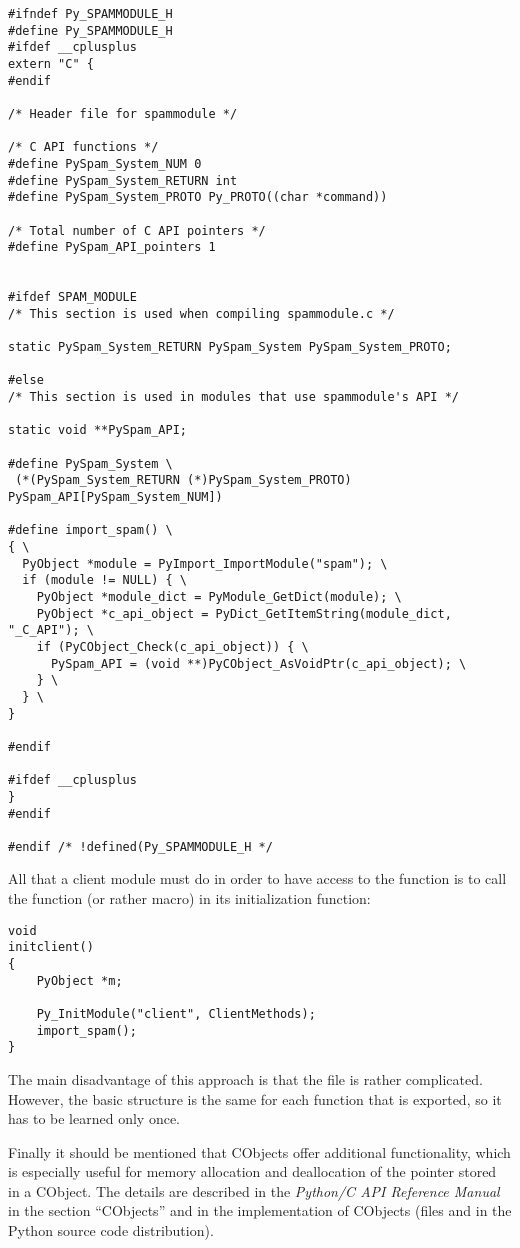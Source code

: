 \documentclass{manual}
\begin{document}
\begin{verbatim}
#ifndef Py_SPAMMODULE_H
#define Py_SPAMMODULE_H
#ifdef __cplusplus
extern "C" {
#endif

/* Header file for spammodule */

/* C API functions */
#define PySpam_System_NUM 0
#define PySpam_System_RETURN int
#define PySpam_System_PROTO Py_PROTO((char *command))

/* Total number of C API pointers */
#define PySpam_API_pointers 1


#ifdef SPAM_MODULE
/* This section is used when compiling spammodule.c */

static PySpam_System_RETURN PySpam_System PySpam_System_PROTO;

#else
/* This section is used in modules that use spammodule's API */

static void **PySpam_API;

#define PySpam_System \
 (*(PySpam_System_RETURN (*)PySpam_System_PROTO) PySpam_API[PySpam_System_NUM])

#define import_spam() \
{ \
  PyObject *module = PyImport_ImportModule("spam"); \
  if (module != NULL) { \
    PyObject *module_dict = PyModule_GetDict(module); \
    PyObject *c_api_object = PyDict_GetItemString(module_dict, "_C_API"); \
    if (PyCObject_Check(c_api_object)) { \
      PySpam_API = (void **)PyCObject_AsVoidPtr(c_api_object); \
    } \
  } \
}

#endif

#ifdef __cplusplus
}
#endif

#endif /* !defined(Py_SPAMMODULE_H */
\end{verbatim}

All that a client module must do in order to have access to the
function  is to call the function (or
rather macro)  in its initialization
function:

\begin{verbatim}
void
initclient()
{
    PyObject *m;

    Py_InitModule("client", ClientMethods);
    import_spam();
}
\end{verbatim}

The main disadvantage of this approach is that the file
 is rather complicated. However, the
basic structure is the same for each function that is
exported, so it has to be learned only once.

Finally it should be mentioned that CObjects offer additional
functionality, which is especially useful for memory allocation and
deallocation of the pointer stored in a CObject. The details
are described in the \emph{Python/C API Reference Manual} in the
section ``CObjects'' and in the implementation of CObjects (files
 and  in the
Python source code distribution).
\end{document}
